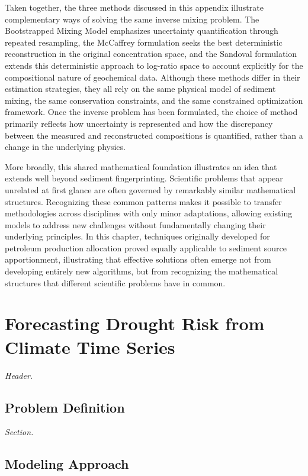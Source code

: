 \documentclass[
  12pt,
  letterpaper,
]{book}
\begin{document}
Taken together, the three methods discussed in this appendix illustrate
complementary ways of solving the same inverse mixing problem. The
Bootstrapped Mixing Model emphasizes uncertainty quantification through
repeated resampling, the McCaffrey formulation seeks the best
deterministic reconstruction in the original concentration space, and
the Sandoval formulation extends this deterministic approach to
log-ratio space to account explicitly for the compositional nature of
geochemical data. Although these methods differ in their estimation
strategies, they all rely on the same physical model of sediment mixing,
the same conservation constraints, and the same constrained optimization
framework. Once the inverse problem has been formulated, the choice of
method primarily reflects how uncertainty is represented and how the
discrepancy between the measured and reconstructed compositions is
quantified, rather than a change in the underlying physics.

More broadly, this shared mathematical foundation illustrates an idea
that extends well beyond sediment fingerprinting. Scientific problems
that appear unrelated at first glance are often governed by remarkably
similar mathematical structures. Recognizing these common patterns makes
it possible to transfer methodologies across disciplines with only minor
adaptations, allowing existing models to address new challenges without
fundamentally changing their underlying principles. In this chapter,
techniques originally developed for petroleum production allocation
proved equally applicable to sediment source apportionment, illustrating
that effective solutions often emerge not from developing entirely new
algorithms, but from recognizing the mathematical structures that
different scientific problems have in common.

\chapter{Forecasting Drought Risk from Climate Time
Series}\label{forecasting-drought-risk-from-climate-time-series}

\emph{Header.}

\section{Problem Definition}\label{problem-definition-11}

\emph{Section.}

\section{Modeling Approach}\label{modeling-approach-11}
\end{document}
